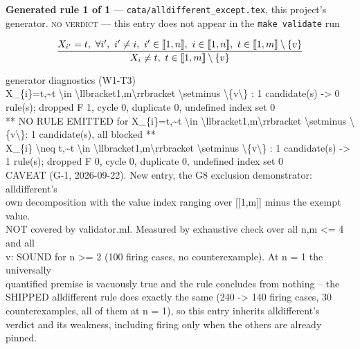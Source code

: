 \documentclass[10pt,a4paper]{article}
\newcommand{\diag}[1]{{\small\itshape\raggedright #1\par}}
\newcommand{\rulebox}[1]{%
  \[\resizebox{\ifdim\width>\linewidth\linewidth\else\width\fi}{!}%
    {$\displaystyle #1$}\]}
\begin{document}
{\small\textbf{Generated rule 1 of 1} --- \texttt{cata/alldifferent\_except.tex}, this project's generator. \textsc{no verdict} --- this entry does not appear in the \texttt{make validate} run\par}
\rulebox{\frac{X_{i'}=t,~\forall i',~i' \neq i,~i' \in \llbracket1,n\rrbracket,~i \in \llbracket1,n\rrbracket,~t \in \llbracket1,m\rrbracket \setminus \{v\}}{X_{i} \neq t,~t \in \llbracket1,m\rrbracket \setminus \{v\}}}

\diag{generator diagnostics (W1-T3)\\{} X\_\{i\}=t,\textasciitilde{}t \textbackslash{}in \textbackslash{}llbracket1,m\textbackslash{}rrbracket \textbackslash{}setminus \textbackslash{}\{v\textbackslash{}\} : 1 candidate(s) -> 0 rule(s); dropped F 1, cycle 0, duplicate 0, undefined index set 0\\{}   ** NO RULE EMITTED for X\_\{i\}=t,\textasciitilde{}t \textbackslash{}in \textbackslash{}llbracket1,m\textbackslash{}rrbracket \textbackslash{}setminus \textbackslash{}\{v\textbackslash{}\}: 1 candidate(s), all blocked **\\{} X\_\{i\} \textbackslash{}neq t,\textasciitilde{}t \textbackslash{}in \textbackslash{}llbracket1,m\textbackslash{}rrbracket \textbackslash{}setminus \textbackslash{}\{v\textbackslash{}\} : 1 candidate(s) -> 1 rule(s); dropped F 0, cycle 0, duplicate 0, undefined index set 0\\{} CAVEAT (G-1, 2026-09-22). New entry, the G8 exclusion demonstrator: alldifferent's\\{} own decomposition with the value index ranging over [[1,m]] minus the exempt value.\\{} NOT covered by validator.ml. Measured by exhaustive check over all n,m <= 4 and all\\{} v: SOUND for n >= 2 (100 firing cases, no counterexample). At n = 1 the universally\\{} quantified premise is vacuously true and the rule concludes from nothing -- the\\{} SHIPPED alldifferent rule does exactly the same (240 -> 140 firing cases, 30\\{} counterexamples, all of them at n = 1), so this entry inherits alldifferent's\\{} verdict and its weakness, including firing only when the others are already pinned.}
\end{document}
